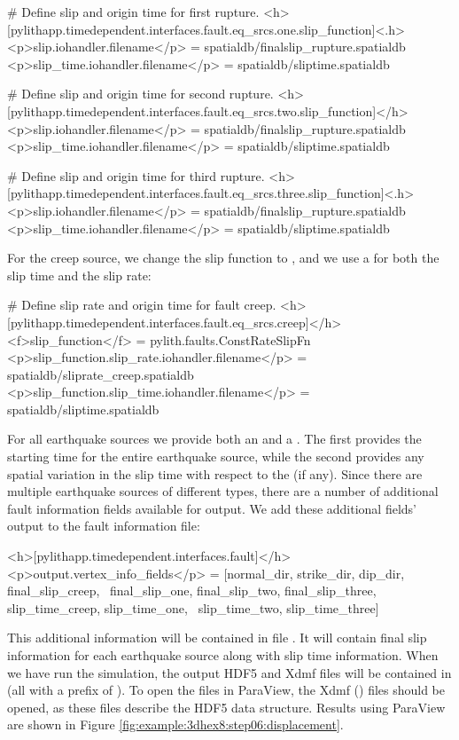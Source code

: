 \begin{cfg}
# Define slip and origin time for first rupture.
<h>[pylithapp.timedependent.interfaces.fault.eq_srcs.one.slip_function]<.h>
<p>slip.iohandler.filename</p> = spatialdb/finalslip_rupture.spatialdb
<p>slip_time.iohandler.filename</p> = spatialdb/sliptime.spatialdb

# Define slip and origin time for second rupture.
<h>[pylithapp.timedependent.interfaces.fault.eq_srcs.two.slip_function]</h>
<p>slip.iohandler.filename</p> = spatialdb/finalslip_rupture.spatialdb
<p>slip_time.iohandler.filename</p> = spatialdb/sliptime.spatialdb

# Define slip and origin time for third rupture.
<h>[pylithapp.timedependent.interfaces.fault.eq_srcs.three.slip_function]<.h>
<p>slip.iohandler.filename</p> = spatialdb/finalslip_rupture.spatialdb
<p>slip_time.iohandler.filename</p> = spatialdb/sliptime.spatialdb
\end{cfg}
For the creep source, we change the slip function to ,
and we use a  for both the slip time and the slip
rate:
\begin{cfg}
# Define slip rate and origin time for fault creep.
<h>[pylithapp.timedependent.interfaces.fault.eq_srcs.creep]</h>
<f>slip_function</f> = pylith.faults.ConstRateSlipFn
<p>slip_function.slip_rate.iohandler.filename</p> = spatialdb/sliprate_creep.spatialdb
<p>slip_function.slip_time.iohandler.filename</p> = spatialdb/sliptime.spatialdb
\end{cfg}
For all earthquake sources we provide both an 
and a . The first provides the starting
time for the entire earthquake source, while the second provides any
spatial variation in the slip time with respect to the 
(if any). Since there are multiple earthquake sources of different
types, there are a number of additional fault information fields available
for output. We add these additional fields' output to the fault information
file:
\begin{cfg}
<h>[pylithapp.timedependent.interfaces.fault]</h>
<p>output.vertex_info_fields</p> = [normal_dir, strike_dir, dip_dir, final_slip_creep, \
  final_slip_one, final_slip_two, final_slip_three, slip_time_creep, slip_time_one, \
  slip_time_two, slip_time_three]
\end{cfg}
This additional information will be contained in file .
It will contain final slip information for each earthquake source
along with slip time information. When we have run the simulation,
the output HDF5 and Xdmf files will be contained in 
(all with a prefix of \filename{step06}). To open the files in ParaView,
the Xdmf (\filename{.xmf}) files should be opened, as these files describe
the HDF5 data structure. Results using ParaView are shown in Figure
\vref{fig:example:3dhex8:step06:displacement}.

